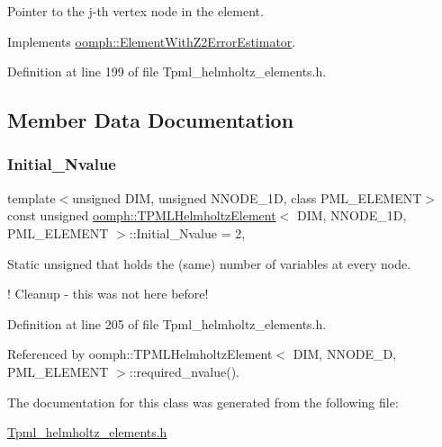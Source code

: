 Pointer to the j-\/th vertex node in the element. 



Implements \hyperlink{classoomph_1_1ElementWithZ2ErrorEstimator_a0eedccc33519f852c5dc2055ddf2774b}{oomph\+::\+Element\+With\+Z2\+Error\+Estimator}.



Definition at line 199 of file Tpml\+\_\+helmholtz\+\_\+elements.\+h.



\subsection{Member Data Documentation}
\mbox{\label{classoomph_1_1TPMLHelmholtzElement_a521b95124efc9da64c1ca2f37a6b2acb}} 
\subsubsection{\texorpdfstring{Initial\+\_\+\+Nvalue}{Initial\_Nvalue}}
{\footnotesize\ttfamily template$<$unsigned D\+IM, unsigned N\+N\+O\+D\+E\+\_\+1D, class P\+M\+L\+\_\+\+E\+L\+E\+M\+E\+NT$>$ \\
const unsigned \hyperlink{classoomph_1_1TPMLHelmholtzElement}{oomph\+::\+T\+P\+M\+L\+Helmholtz\+Element}$<$ D\+IM, N\+N\+O\+D\+E\+\_\+1D, P\+M\+L\+\_\+\+E\+L\+E\+M\+E\+NT $>$\+::Initial\+\_\+\+Nvalue = 2\hspace{0.3cm}{\ttfamily [static]}, {\ttfamily [private]}}



Static unsigned that holds the (same) number of variables at every node. 

! Cleanup -\/ this was not here before! 

Definition at line 205 of file Tpml\+\_\+helmholtz\+\_\+elements.\+h.



Referenced by oomph\+::\+T\+P\+M\+L\+Helmholtz\+Element$<$ D\+I\+M, N\+N\+O\+D\+E\+\_\+D, P\+M\+L\+\_\+\+E\+L\+E\+M\+E\+N\+T $>$\+::required\+\_\+nvalue().



The documentation for this class was generated from the following file\+:\begin{DoxyCompactItemize}
\item 
\hyperlink{Tpml__helmholtz__elements_8h}{Tpml\+\_\+helmholtz\+\_\+elements.\+h}\end{DoxyCompactItemize}
